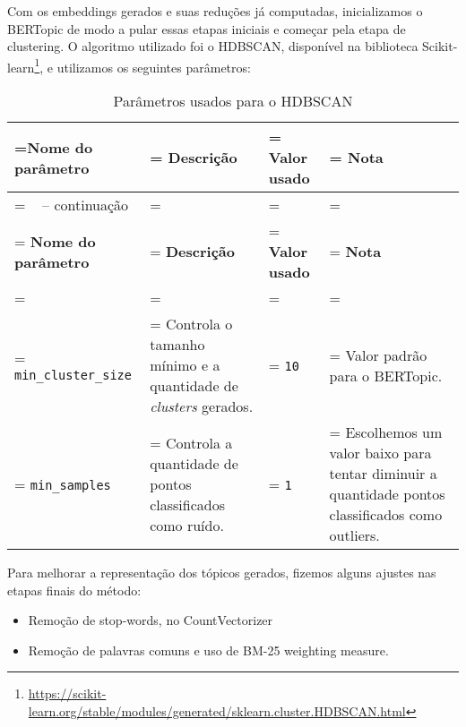 Com os embeddings gerados e suas reduções já computadas, inicializamos o BERTopic de modo a pular essas etapas iniciais e começar pela etapa de clustering. O algoritmo utilizado foi o HDBSCAN, disponível na biblioteca Scikit-learn\footnote{\url{https://scikit-learn.org/stable/modules/generated/sklearn.cluster.HDBSCAN.html}}, e utilizamos os seguintes parâmetros:

\begin{xltabular}{1\textwidth} {
    |>{\centering\arraybackslash{}\hsize\linewidth=\hsize}X
    |>{\centering\arraybackslash{}\hsize\linewidth=\hsize}X
    |>{\centering\arraybackslash{}\hsize\linewidth=\hsize}X
    |>{\centering\arraybackslash{}\hsize\linewidth=\hsize}X|
    }
\caption{Parâmetros usados para o HDBSCAN} \label{tab:hdbscan_params}\\
\hline \hline
\textbf{Nome do parâmetro} & \textbf{Descrição} & \textbf{Valor usado} & \textbf{Nota} \\
\hline \hline
\endfirsthead
{}%
{\tablename\ \thetable{} -- continuação} \\
\hline \hline
\textbf{Nome do parâmetro} & \textbf{Descrição} & \textbf{Valor usado} & \textbf{Nota} \\
\hline \hline
\endhead
\hline\hline {} \\ \hline \hline
\endfoot
\hline
\endlastfoot
\hline
\verb|min_cluster_size| & Controla o tamanho mínimo e a quantidade de \textit{clusters} gerados. & \verb|10| & Valor padrão para o BERTopic. \\
\hline
\verb|min_samples| & Controla a quantidade de pontos classificados como ruído. & \verb|1| & Escolhemos um valor baixo para tentar diminuir a quantidade pontos classificados como outliers. \\
\hline \hline
\end{xltabular}

Para melhorar a representação dos tópicos gerados, fizemos alguns ajustes nas etapas finais do método:
\begin{itemize}
    \item Remoção de stop-words, no CountVectorizer
    \item Remoção de palavras comuns e uso de BM-25 weighting measure.
\end{itemize}